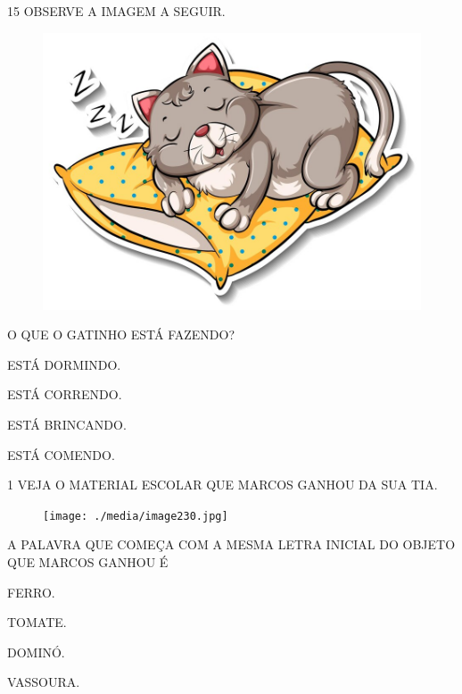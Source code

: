 \num{15} OBSERVE A IMAGEM A SEGUIR.

\begin{figure}[H]
\centering
\includegraphics[width=.7\textwidth]{./media/image229.jpg}
\end{figure}

O QUE O GATINHO ESTÁ FAZENDO?

\begin{escolha}

\item ESTÁ DORMINDO.

\item ESTÁ CORRENDO.

\item ESTÁ BRINCANDO.

\item ESTÁ COMENDO.

\end{escolha}

\blankpage
\vspace*{-3.4cm}


\num{1} VEJA O MATERIAL ESCOLAR QUE MARCOS GANHOU DA SUA TIA.

\begin{figure}[H]
\centering
\texttt{[image: ./media/image230.jpg]}
\end{figure}

A PALAVRA QUE COMEÇA COM A MESMA LETRA INICIAL DO OBJETO QUE MARCOS GANHOU É

\begin{escolha}

\item FERRO.

\item TOMATE.

\item DOMINÓ.

\item VASSOURA.

\end{escolha}

